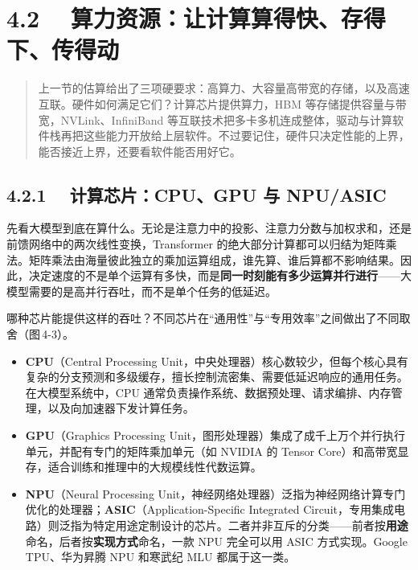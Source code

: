 \documentclass{article}
\begin{document}
\section*{4.2　 算力资源：让计算算得快、存得下、传得动}


\begin{quote}


\noindent 上一节的估算给出了三项硬要求：高算力、大容量高带宽的存储，以及高速互联。硬件如何满足它们？计算芯片提供算力，HBM 等存储提供容量与带宽，NVLink、InfiniBand 等互联技术把多卡多机连成整体，驱动与计算软件栈再把这些能力开放给上层软件。不过要记住，硬件只决定性能的上界，能否接近上界，还要看软件能否用好它。


\end{quote}

\subsection*{4.2.1　 计算芯片：CPU、GPU 与 NPU/ASIC}


先看大模型到底在算什么。无论是注意力中的投影、注意力分数与加权求和，还是前馈网络中的两次线性变换，Transformer 的绝大部分计算都可以归结为矩阵乘法。矩阵乘法由海量彼此独立的乘加运算组成，谁先算、谁后算都不影响结果。因此，决定速度的不是单个运算有多快，而是\textbf{同一时刻能有多少运算并行进行}——大模型需要的是高并行吞吐，而不是单个任务的低延迟。

哪种芯片能提供这样的吞吐？不同芯片在“通用性”与“专用效率”之间做出了不同取舍（图\,4-3）。
\begin{itemize}
  \item \textbf{CPU}（{Central Processing Unit}，中央处理器）核心数较少，但每个核心具有复杂的分支预测和多级缓存，擅长控制流密集、需要低延迟响应的通用任务。在大模型系统中，CPU 通常负责操作系统、数据预处理、请求编排、内存管理，以及向加速器下发计算任务。
  \item \textbf{GPU}（{Graphics Processing Unit}，图形处理器）集成了成千上万个并行执行单元，并配有专门的矩阵乘加单元（如 NVIDIA 的 Tensor Core）和高带宽显存，适合训练和推理中的大规模线性代数运算\cite{hwu2026pmpp}。
  \item \textbf{NPU}（{Neural Processing Unit}，神经网络处理器）泛指为神经网络计算专门优化的处理器；\textbf{ASIC}（{Application-Specific Integrated Circuit}，专用集成电路）则泛指为特定用途定制设计的芯片。二者并非互斥的分类——前者按\textbf{用途}命名，后者按\textbf{实现方式}命名，一款 NPU 完全可以用 ASIC 方式实现。Google TPU、华为昇腾 NPU 和寒武纪 MLU 都属于这一类。
\end{itemize}
\end{document}

